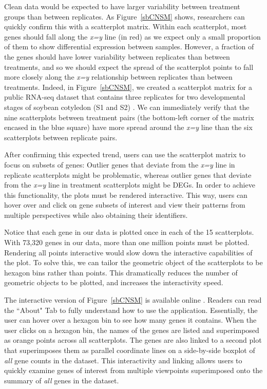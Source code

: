 \documentclass{bmcart}
\begin{document}
\begin{linenumbers}
\begin{doublespacing}
Clean data would be expected to have larger variability between treatment groups than between replicates. As Figure~\ref{sbCNSM} shows, researchers can quickly confirm this with a scatterplot matrix. Within each scatterplot, most genes should fall along the \textit{x=y} line (in red) as we expect only a small proportion of them to show differential expression between samples. However, a fraction of the genes should have lower variability between replicates than between treatments, and so we should expect the spread of the scatterplot points to fall more closely along the \textit{x=y} relationship between replicates than between treatments. Indeed, in Figure~\ref{sbCNSM}, we created a scatterplot matrix for a public RNA-seq dataset that contains three replicates for two developmental stages of soybean cotyledon (S1 and S2) \cite{Brown}. We can immediately verify that the nine scatterplots between treatment pairs (the bottom-left corner of the matrix encased in the blue square) have more spread around the \textit{x=y} line than the six scatterplots between replicate pairs.

After confirming this expected trend, users can use the scatterplot matrix to focus on subsets of genes: Outlier genes that deviate from the \textit{x=y} line in replicate scatterplots might be problematic, whereas outlier genes that deviate from the \textit{x=y} line in treatment scatterplots might be DEGs. In order to achieve this functionality, the plots must be rendered interactive. This way, users can hover over and click on gene subsets of interest and view their patterns from multiple perspectives while also obtaining their identifiers.

Notice that each gene in our data is plotted once in each of the 15 scatterplots. With 73,320 genes in our data, more than one million points must be plotted. Rendering all points interactive would slow down the interactive capabilities of the plot. To solve this, we can tailor the geometric object of the scatterplots to be hexagon bins rather than points. This dramatically reduces the number of geometric objects to be plotted, and increases the interactivity speed.

The interactive version of Figure~\ref{sbCNSM} is available online \cite{scatmat}. Readers can read the ``About" Tab to fully understand how to use the application. Essentially, the user can hover over a hexagon bin to see how many genes it contains. When the user clicks on a hexagon bin, the names of the genes are listed and superimposed as orange points across all scatterplots. The genes are also linked to a second plot that superimposes them as parallel coordinate lines on a side-by-side boxplot of \textit{all} gene counts in the dataset. This interactivity and linking allows users to quickly examine genes of interest from multiple viewpoints superimposed onto the summary of \textit{all} genes in the dataset.


\end{doublespacing}
\end{linenumbers}
\end{document}

